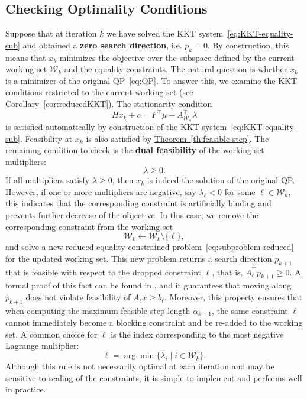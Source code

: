 \documentclass{book}
\theoremstyle{definition}
\newcommand{\thref}[1]{\hyperref[#1]{Theorem~\ref*{#1}}}
\newcommand{\corref}[1]{\hyperref[#1]{Corollary~\ref*{#1}}}
\numberwithin{algorithm_}{chapter}
\begin{document}
\subsection{Checking Optimality Conditions}

Suppose that at iteration \(k\) we have solved the KKT system~\eqref{eq:KKT-equality-sub} and obtained a \textbf{zero search direction}, i.e. \(p_k = 0\).  
By construction, this means that \(x_k\) minimizes the objective over the subspace defined by the current working set \(\mathcal{W}_k\) and the equality constraints.  
The natural question is whether \(x_k\) is a minimizer of the original QP~\eqref{eq:QP}. To answer this, we examine the KKT conditions restricted to the current working set (see \corref{cor:reducedKKT}).  
The stationarity condition
\[
H x_k + c = F^\top \mu + A_{\mathcal{W}_k}^\top \lambda
\]
is satisfied automatically by construction of the KKT system~\eqref{eq:KKT-equality-sub}.  
Feasibility at $x_k$ is also satisfied by \thref{th:feasible-step}.  
The remaining condition to check is the \textbf{dual feasibility} of the working-set multipliers:
\[
\lambda \ge 0.
\]
If all multipliers satisfy \(\lambda \ge 0\), then \(x_k\) is indeed the solution of the original QP.  
However, if one or more multipliers are negative, say \(\lambda_\ell < 0\) for some \(\ell \in \mathcal{W}_k\), this indicates that the corresponding constraint is artificially binding and prevents further decrease of the objective. In this case, we remove the corresponding constraint from the working set
\[
\mathcal{W}_k \gets \mathcal{W}_k \setminus \{\ell\},
\]
and solve a new reduced equality-constrained problem~\eqref{eq:subproblem-reduced} for the updated working set.
This new problem returns a search direction $p_{k+1}$ that is feasible with respect to the dropped constraint $\ell$, that is, 
$A_\ell^\top p_{k+1} \geq 0$. A formal proof of this fact can be found in \cite{nocedal2006numerical}, and it guarantees that moving along $p_{k+1}$ does not violate feasibility of $A_\ell x \geq b_\ell$. Moreover, this property ensures that when computing the maximum feasible step length $\alpha_{k+1}$, 
the same constraint $\ell$ cannot immediately become a blocking constraint and be re-added to the working set. A common choice for $\ell$ is the index corresponding to the most negative Lagrange multiplier:
\[
    \ell = \arg\min \{\lambda_i \mid i \in \mathcal{W}_k \}.
\]
Although this rule is not necessarily optimal at each iteration and may be sensitive to scaling of the constraints, it is simple to implement and performs well in practice.
\end{document}
